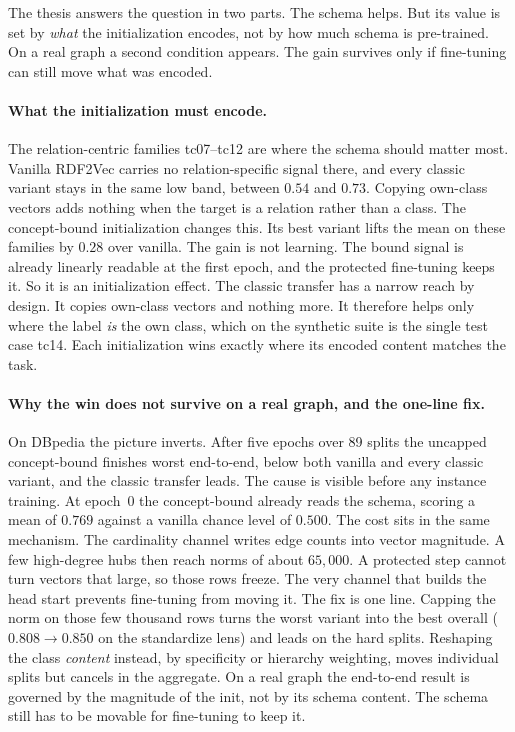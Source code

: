 \documentclass[a4paper,oneside,bibliography=totoc]{scrbook}
\begin{document}
The thesis answers the question in two parts. The schema helps. But its value is
set by \emph{what} the initialization encodes, not by how much schema is
pre-trained. On a real graph a second condition appears. The gain survives only
if fine-tuning can still move what was encoded.

\paragraph{What the initialization must encode.} The relation-centric families
tc07--tc12 are where the schema should matter most. Vanilla RDF2Vec carries no
relation-specific signal there, and every classic variant stays in the same low
band, between $0.54$ and $0.73$. Copying own-class vectors adds nothing when the
target is a relation rather than a class. The concept-bound initialization changes
this. Its best variant lifts the mean on these families by $0.28$ over vanilla.
The gain is not learning. The bound signal is already linearly readable at the
first epoch, and the protected fine-tuning keeps it. So it is an initialization
effect. The classic transfer has a narrow reach by design. It copies own-class
vectors and nothing more. It therefore helps only where the label \emph{is} the
own class, which on the synthetic suite is the single test case tc14. Each
initialization wins exactly where its encoded content matches the task.

\paragraph{Why the win does not survive on a real graph, and the one-line fix.}
On DBpedia the picture inverts. After five epochs over 89 splits the uncapped
concept-bound finishes worst end-to-end, below both vanilla and every classic
variant, and the classic transfer leads. The cause is visible before any instance
training. At epoch~0 the concept-bound already reads the schema, scoring a mean
of $0.769$ against a vanilla chance level of $0.500$. The cost sits in the same
mechanism. The cardinality channel writes edge counts into vector magnitude. A
few high-degree hubs then reach norms of about $65{,}000$. A protected step cannot
turn vectors that large, so those rows freeze. The very channel that builds the
head start prevents fine-tuning from moving it. The fix is one line. Capping the
norm on those few thousand rows turns the worst variant into the best overall
($0.808 \rightarrow 0.850$ on the standardize lens) and leads on the hard splits.
Reshaping the class
\emph{content} instead, by specificity or hierarchy weighting, moves individual
splits but cancels in the aggregate. On a real graph the end-to-end result is
governed by the magnitude of the init, not by its schema content. The schema
still has to be movable for fine-tuning to keep it.
\end{document}
